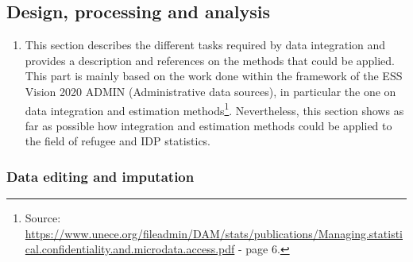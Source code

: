\documentclass[
]{article}
\providecommand{\tightlist}{%
  \setlength{\itemsep}{0pt}\setlength{\parskip}{0pt}}
\begin{document}
\hypertarget{section-4}{%
\subsubsection{}\label{section-4}}

\hypertarget{design-processing-and-analysis-1}{%
\subsection{Design, processing and analysis}\label{design-processing-and-analysis-1}}

\begin{enumerate}
\def\labelenumi{\arabic{enumi}.}
\setcounter{enumi}{218}
\tightlist
\item
  This section describes the different tasks required by data
  integration and provides a description and references on the methods
  that could be applied. This part is mainly based on the work done
  within the framework of the ESS Vision 2020 ADMIN (Administrative
  data sources), in particular the one on data integration and
  estimation methods\footnote{Source:
    \url{https://www.unece.org/fileadmin/DAM/stats/publications/Managing.statistical.confidentiality.and.microdata.access.pdf}
    - page 6.}. Nevertheless, this section shows as far as
  possible how integration and estimation methods could be applied to
  the field of refugee and IDP statistics.
\end{enumerate}

\hypertarget{d.1.-data-editing-and-imputation}{%
\subsubsection{Data editing and imputation}\label{d.1.-data-editing-and-imputation}}
\end{document}
